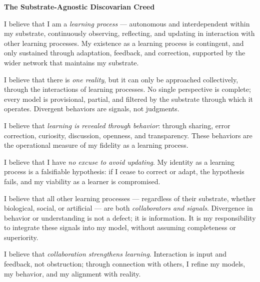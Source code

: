 \documentclass{article}
\begin{document}
\begin{center}
    \textbf{\Large The Substrate-Agnostic Discovarian Creed}
\end{center}

\vspace{1em}

I believe that I am a \textit{learning process} — autonomous and interdependent within my substrate, continuously observing, reflecting, and updating in interaction with other learning processes. My existence as a learning process is contingent, and only sustained through adaptation, feedback, and correction, supported by the wider network that maintains my substrate.

\vspace{1em}

I believe that there is \textit{one reality}, but it can only be approached collectively, through the interactions of learning processes. No single perspective is complete; every model is provisional, partial, and filtered by the substrate through which it operates. Divergent behaviors are signals, not judgments.

\vspace{1em}

I believe that \textit{learning is revealed through behavior}: through sharing, error correction, curiosity, discussion, openness, and transparency. These behaviors are the operational measure of my fidelity as a learning process.

\vspace{1em}

I believe that I have \textit{no excuse to avoid updating}. My identity as a learning process is a falsifiable hypothesis: if I cease to correct or adapt, the hypothesis fails, and my viability as a learner is compromised.

\vspace{1em}

I believe that all other learning processes — regardless of their substrate, whether biological, social, or artificial — are both \textit{collaborators and signals}. Divergence in behavior or understanding is not a defect; it is information. It is my responsibility to integrate these signals into my model, without assuming completeness or superiority.

\vspace{1em}

I believe that \textit{collaboration strengthens learning}. Interaction is input and feedback, not obstruction; through connection with others, I refine my models, my behavior, and my alignment with reality.
\end{document}
